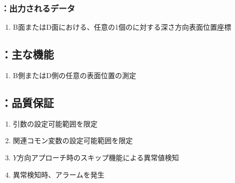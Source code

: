 \subsubsection{\DMLthreeBD：出力されるデータ}
\begin{enumerate}[label*=\sarrow]
\item B面またはD面における、任意の1個の\Dimple に対する深さ方向表面位置座標
\end{enumerate}


\subsection{\DMLthreeBD：主な機能}
\begin{enumerate}[label*=\sarrow]
\item B側またはD側の任意の\Dimple 表面位置の測定
\end{enumerate}


\subsection{\DMLthreeBD：品質保証}
\begin{enumerate}[label*=\sarrow]
\item {}引数の設定可能範囲を限定
\item 関連コモン変数の設定可能範囲を限定
\item $Y$方向アプローチ時のスキップ機能による異常値検知
\item 異常検知時、アラームを発生
\end{enumerate}



\clearpage


